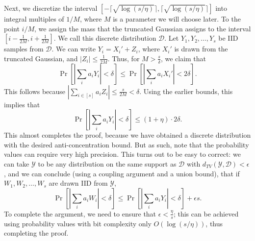 \documentclass[11pt]{article}
\makeatletter
\theoremstyle{plain}
\theoremstyle{plain}
\theoremstyle{definition}
\theoremstyle{plain}
\theoremstyle{remark}
\newenvironment{proof}[1][\protect\proofname]{\par
	\normalfont\topsep6\p@\@plus6\p@\relax
	\trivlist
	\itemindent\parindent
	\item[\hskip\labelsep\scshape #1]\ignorespaces
}{\endtrivlist\@endpefalse
}
\providecommand{\proofname}{Proof}
\newcommand{\cD}{\mathcal{D}}
\newcommand{\cY}{\mathcal{Y}}
\makeatother
\begin{document}
\begin{proof}
Next, we discretize the interval $[ -\lceil  \sqrt{\log (s/\eta)} \rceil, \lceil  \sqrt{\log (s/\eta)} \rceil ] $ into integral multiples of $1/M$, where $M$ is a parameter we will choose later. To the point $i/M$, we assign the mass that the truncated Gaussian assigns to the interval $[i - \frac{1}{2M}, i+\frac{1}{2M}] $. We call this discrete distribution $\cD$.  Let $Y_1, Y_2, \dots, Y_s$ be IID samples from $\cD$. We can write $Y_i = X_i' + Z_i$, where $X_i'$ is drawn from the truncated Gaussian, and $|Z_i| \le \frac{1}{2M}$. Thus, for $M > \frac{s}{\delta}$, we claim that
\[ \Pr[ |\sum_i a_i Y_i| < \delta] \le \Pr[ | \sum_i a_i X_i' | <  2\delta ]. \]
This follows because $|\sum_{i \in [s]} a_i Z_i| \le \frac{s}{2M} < \delta$.  Using the earlier bounds, this implies that
\[ \Pr[ |\sum_i a_i Y_i| < \delta] \le (1+\eta) \cdot 2\delta. \]
This almost completes the proof, because we have obtained a discrete distribution with the desired anti-concentration bound. But as such, note that the probability values can require very high precision. This turns out to be easy to correct: we can take $\cY$ to be any distribution on the same support as $\cD$ with $d_{TV} (\cY, \cD) < \epsilon$, and we can conclude (using a coupling argument and a union bound), that if $W_1, W_2, \dots, W_s$ are drawn IID from $\cY$,
\[ \Pr[ |\sum_i a_i W_i| < \delta] \le \Pr[ | \sum_i a_i Y_i | <  \delta ] + \epsilon s. \]
To complete the argument, we need to ensure that $\epsilon < \frac{\eta}{s}$; this can be achieved using probability values with bit complexity only $O(\log (s/\eta))$, thus completing the proof.
\end{proof}
\end{document}
